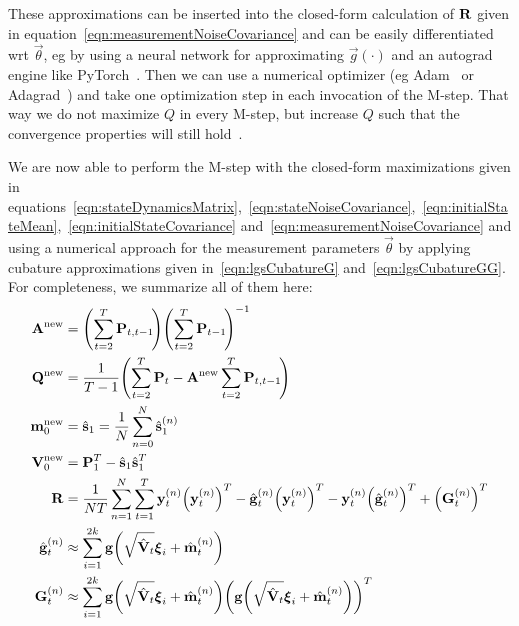 	These approximations can be inserted into the closed-form calculation of \(\boldsymbol{\mathrm{R}}\) given in equation~\ref{eqn:measurementNoiseCovariance} and can be easily differentiated \ac{wrt} \(\vec{\theta}\), \ac{eg} by using a neural network for approximating \(\vec{g}(\cdot)\) and an autograd engine like PyTorch~\cite{paszkePyTorchImperativeStyle2019}. Then we can use a numerical optimizer (\ac{eg} Adam~\cite{kingmaAdamMethodStochastic2017} or Adagrad~\cite{duchiAdaptiveSubgradientMethods2011}) and take one optimization step in each invocation of the M-step. That way we do not maximize \(Q\) in every M-step, but increase \(Q\) such that the convergence properties will still hold~\cite{moonExpectationmaximizationAlgorithm1996}.
	
	We are now able to perform the M-step with the closed-form maximizations given in equations~\ref{eqn:stateDynamicsMatrix},~\ref{eqn:stateNoiseCovariance},~\ref{eqn:initialStateMean},~\ref{eqn:initialStateCovariance} and~\ref{eqn:measurementNoiseCovariance} and using a numerical approach for the measurement parameters \(\vec{\theta}\) by applying cubature approximations given in~\ref{eqn:lgsCubatureG} and~\ref{eqn:lgsCubatureGG}. For completeness, we summarize all of them here:
	\begin{align*}
		\boldsymbol{\mathrm{A}}^{\mathrm{new}} &= \Bigg(\! \sum_{t = 2}^{T} \boldsymbol{\mathrm{P}}_{t, t - 1} \!\Bigg) \Bigg(\! \sum_{t = 2}^{T} \boldsymbol{\mathrm{P}}_{t - 1} \!\Bigg)^{-1} \\
		\boldsymbol{\mathrm{Q}}^{\mathrm{new}} &= \frac{1}{T - 1} \Bigg(\! \sum_{t = 2}^{T} \boldsymbol{\mathrm{P}}_t - \boldsymbol{\mathrm{A}}^{\mathrm{new}} \sum_{t = 2}^{T} \boldsymbol{\mathrm{P}}_{t, t - 1} \!\Bigg) \\
		\boldsymbol{\mathrm{m}}_0^{\mathrm{new}} &= \hat{\boldsymbol{\mathrm{s}}}_1 = \frac{1}{N} \sum_{n = 0}^{N} \hat{\boldsymbol{\mathrm{s}}}_1^{(n)} \\
		\boldsymbol{\mathrm{V}}_0^{\mathrm{new}} &= \boldsymbol{\mathrm{P}}_1^T - \hat{\boldsymbol{\mathrm{s}}}_1 \hat{\boldsymbol{\mathrm{s}}}_1^T \\
		\boldsymbol{\mathrm{R}} &= \frac{1}{NT} \sum_{n = 1}^{N} \sum_{t = 1}^{T} \boldsymbol{\mathrm{y}}_t^{(n)} \Big(\boldsymbol{\mathrm{y}}_t^{(n)}\Big)^T - \hat{\boldsymbol{\mathrm{g}}}_t^{(n)} \Big(\boldsymbol{\mathrm{y}}_t^{(n)}\Big)^T - \boldsymbol{\mathrm{y}}_t^{(n)} \Big(\hat{\boldsymbol{\mathrm{g}}}_t^{(n)}\Big)^T + \Big(\boldsymbol{\mathrm{G}}_t^{(n)}\Big)^T \\
		\hat{\boldsymbol{\mathrm{g}}}_t^{(n)} &\approx \sum_{i = 1}^{2k} \boldsymbol{\mathrm{g}}\bigg(\sqrt{\hat{\boldsymbol{\mathrm{V}}}_t} \boldsymbol{\mathrm{\xi}}_i + \hat{\boldsymbol{\mathrm{m}}}_t^{(n)}\bigg) \\
		\boldsymbol{\mathrm{G}}_t^{(n)} &\approx \sum_{i = 1}^{2k} \boldsymbol{\mathrm{g}}\bigg(\sqrt{\hat{\boldsymbol{\mathrm{V}}}_t} \boldsymbol{\mathrm{\xi}}_i + \hat{\boldsymbol{\mathrm{m}}}_t^{(n)}\bigg) \bigg( \boldsymbol{\mathrm{g}}\bigg(\sqrt{\hat{\boldsymbol{\mathrm{V}}}_t} \boldsymbol{\mathrm{\xi}}_i + \hat{\boldsymbol{\mathrm{m}}}_t^{(n)}\bigg) \bigg)^T
	\end{align*}




















